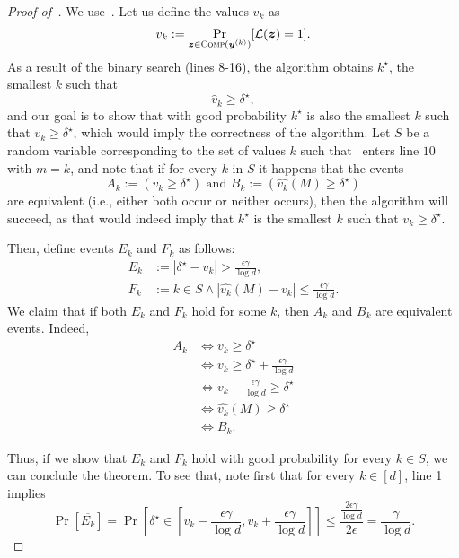 	

\begin{proof}[Proof of~]
We use~. Let us define the values $v_k$ as
	\[
		v_k := \Pr_{{\bm{z}} \in \textsc{Comp}({\bm{y}}^{(k)})}[\mathcal{L}({\bm{z}}) = 1].
	\]
As a result of the binary search (lines 8-16), the algorithm obtains $k^\star$, the smallest $k$ such that
\[
	\hat{v}_k \geq \delta^\star,
\]
and our goal is to show that with good probability $k^\star$ is also the smallest $k$ such that $v_k \geq \delta^\star$, which would imply the correctness of the algorithm.
Let $S$ be a random variable corresponding to the set of values $k$ such that~ enters line $10$ with $m=k$, and note that if for every $k$ in $S$ it happens that the events 
\[
	A_k := \left(v_k \geq \delta^\star \right) \text{ and }  B_k := \left(\hat{v_k}(M) \geq \delta^\star\right)
\]
are equivalent (i.e., either both occur or neither occurs), then the algorithm will succeed, as that would indeed imply that $k^\star$ is the smallest $k$ such that $v_k \geq \delta^\star$. 

Then, define events $E_k$ and $F_k$ as follows:
\begin{align*}
	E_k &:= |\delta^\star - v_k| > \frac{\epsilon \gamma}{\log d},\\
	F_k &:= k \in S \land |\hat{v_k}(M) - v_k| \leq \frac{\epsilon \gamma}{\log d}.
\end{align*}
We claim that if both $E_k$ and $F_k$ hold for some $k$, then $A_k$ and $B_k$ are equivalent events. Indeed,
\begin{align*}
	A_k &\iff v_k \geq \delta^\star\\
		&\iff v_k \geq \delta^\star + \frac{\epsilon \gamma}{\log d} \tag{By $E_k$}\\
		&\iff v_k - \frac{\epsilon \gamma}{\log d} \geq \delta^\star\\
		&\iff \hat{v_k}(M) \geq \delta^\star \tag{By $F_k$}\\
		&\iff B_k.
\end{align*}

Thus, if we show that $E_k$ and $F_k$ hold with good probability for every $k \in S$, we can conclude the theorem.
To see that, note first that for every $k \in [d]$, line 1 implies
\[
	\Pr[\overline{E_k}] = \Pr\left[\delta^\star \in \left[v_k - \frac{\epsilon \gamma}{\log d}, v_k + \frac{\epsilon \gamma}{\log d}\right]\right] \leq \frac{\frac{2\epsilon \gamma}{\log d}}{2\epsilon} = \frac{\gamma}{\log d}.
\]


\end{proof}
